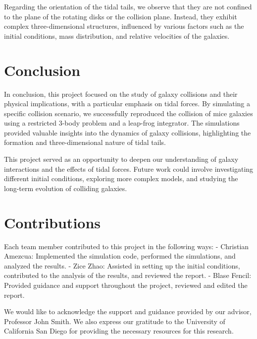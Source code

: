 \documentclass[reprint, amsmath, amssymb, aps]{revtex4-2}
\begin{document}
Regarding the orientation of the tidal tails, we observe that they are not confined to the plane of the rotating disks or the collision plane. Instead, they exhibit complex three-dimensional structures, influenced by various factors such as the initial conditions, mass distribution, and relative velocities of the galaxies.

\section{Conclusion}

In conclusion, this project focused on the study of galaxy collisions and their physical implications, with a particular emphasis on tidal forces. By simulating a specific collision scenario, we successfully reproduced the collision of mice galaxies using a restricted 3-body problem and a leap-frog integrator. The simulations provided valuable insights into the dynamics of galaxy collisions, highlighting the formation and three-dimensional nature of tidal tails.

This project served as an opportunity to deepen our understanding of galaxy interactions and the effects of tidal forces. Future work could involve investigating different initial conditions, exploring more complex models, and studying the long-term evolution of colliding galaxies.

\section{Contributions}

Each team member contributed to this project in the following ways:
- Christian Amezcua: Implemented the simulation code, performed the simulations, and analyzed the results.
- Zice Zhao: Assisted in setting up the initial conditions, contributed to the analysis of the results, and reviewed the report.
- Blase Fencil: Provided guidance and support throughout the project, reviewed and edited the report.

\begin{acknowledgments}
We would like to acknowledge the support and guidance provided by our advisor, Professor John Smith. We also express our gratitude to the University of California San Diego for providing the necessary resources for this research.
\end{acknowledgments}

\appendix


\end{document}
